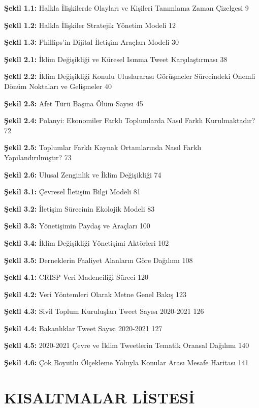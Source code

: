 \documentclass[
]{book}
\begin{document}
\textbf{Şekil 1.1:} Halkla İlişkilerde Olayları ve Kişileri Tanımlama Zaman Çizelgesi 9

\textbf{Şekil 1.2:} Halkla İlişkiler Stratejik Yönetim Modeli 12

\textbf{Şekil 1.3:} Phillips'in Dijital İletişim Araçları Modeli 30

\textbf{Şekil 2.1:} İklim Değişikliği ve Küresel Isınma Tweet Karşılaştırması 38

\textbf{Şekil 2.2:} İklim Değişikliği Konulu Uluslararası Görüşmeler Sürecindeki Önemli Dönüm Noktaları ve Gelişmeler 40

\textbf{Şekil 2.3:} Afet Türü Başına Ölüm Sayısı 45

\textbf{Şekil 2.4:} Polanyi: Ekonomiler Farklı Toplumlarda Nasıl Farklı Kurulmaktadır? 72

\textbf{Şekil 2.5:} Toplumlar Farklı Kaynak Ortamlarında Nasıl Farklı Yapılandırılmıştır? 73

\textbf{Şekil 2.6:} Ulusal Zenginlik ve İklim Değişikliği 74

\textbf{Şekil 3.1:} Çevresel İletişim Bilgi Modeli 81

\textbf{Şekil 3.2:} İletişim Sürecinin Ekolojik Modeli 83

\textbf{Şekil 3.3:} Yönetişimin Paydaş ve Araçları 100

\textbf{Şekil 3.4:} İklim Değişikliği Yönetişimi Aktörleri 102

\textbf{Şekil 3.5:} Derneklerin Faaliyet Alanların Göre Dağılımı 108

\textbf{Şekil 4.1:} CRISP Veri Madenciliği Süreci 120

\textbf{Şekil 4.2:} Veri Yöntemleri Olarak Metne Genel Bakış 123

\textbf{Şekil 4.3:} Sivil Toplum Kuruluşları Tweet Sayısı 2020-2021 126

\textbf{Şekil 4.4:} Bakanlıklar Tweet Sayısı 2020-2021 127

\textbf{Şekil 4.5:} 2020-2021 Çevre ve İklim Tweetlerin Tematik Oransal Dağılımı 140

\textbf{Şekil 4.6:} Çok Boyutlu Ölçekleme Yoluyla Konular Arası Mesafe Haritası 141

\hypertarget{kisaltmalar-listesi}{%
\chapter*{KISALTMALAR LİSTESİ}\label{kisaltmalar-listesi}}
\end{document}
